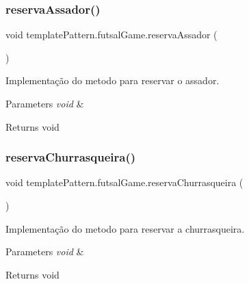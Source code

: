 \subsubsection{\texorpdfstring{reservaAssador()}{reservaAssador()}}
{\footnotesize\ttfamily void template\+Pattern.\+futsal\+Game.\+reserva\+Assador (\begin{DoxyParamCaption}{ }\end{DoxyParamCaption})}



Implementação do metodo para reservar o assador. 


\begin{DoxyParams}{Parameters}
{\em void} & \\
\hline
\end{DoxyParams}
\begin{DoxyReturn}{Returns}
void 
\end{DoxyReturn}
\mbox{\label{classtemplate_pattern_1_1futsal_game_ab7e7eb569d4557215737ab015c42c8d8}} 
\subsubsection{\texorpdfstring{reservaChurrasqueira()}{reservaChurrasqueira()}}
{\footnotesize\ttfamily void template\+Pattern.\+futsal\+Game.\+reserva\+Churrasqueira (\begin{DoxyParamCaption}{ }\end{DoxyParamCaption})}



Implementação do metodo para reservar a churrasqueira. 


\begin{DoxyParams}{Parameters}
{\em void} & \\
\hline
\end{DoxyParams}
\begin{DoxyReturn}{Returns}
void 
\end{DoxyReturn}
\mbox{\label{classtemplate_pattern_1_1futsal_game_a92fbc57e4617dae9c523bea81e5b2eb1}} 
